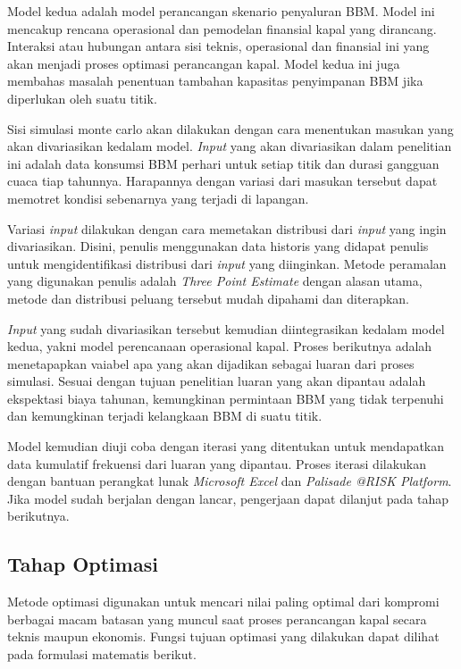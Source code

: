     Model kedua adalah model perancangan skenario penyaluran BBM. Model ini mencakup rencana operasional dan pemodelan finansial kapal yang dirancang. Interaksi atau hubungan antara sisi teknis, operasional dan finansial ini yang akan menjadi proses optimasi perancangan kapal. Model kedua ini juga membahas masalah penentuan tambahan kapasitas penyimpanan BBM jika diperlukan oleh suatu titik.

    Sisi simulasi monte carlo akan dilakukan dengan cara menentukan masukan yang akan divariasikan kedalam model. \emph{Input} yang akan divariasikan dalam penelitian ini adalah data konsumsi BBM perhari untuk setiap titik dan durasi gangguan cuaca tiap tahunnya. Harapannya dengan variasi dari masukan tersebut dapat memotret kondisi sebenarnya yang terjadi di lapangan.

    Variasi \emph{input} dilakukan dengan cara memetakan distribusi dari \emph{input} yang ingin divariasikan. Disini, penulis menggunakan data historis yang didapat penulis untuk mengidentifikasi distribusi dari \emph{input} yang diinginkan. Metode peramalan yang digunakan penulis adalah \emph{Three Point Estimate} dengan alasan utama, metode dan distribusi peluang tersebut mudah dipahami dan diterapkan.

    \emph{Input} yang sudah divariasikan tersebut kemudian diintegrasikan kedalam model kedua, yakni model perencanaan operasional kapal. Proses berikutnya adalah menetapapkan vaiabel apa yang akan dijadikan sebagai luaran dari proses simulasi. Sesuai dengan tujuan penelitian luaran yang akan dipantau adalah ekspektasi biaya tahunan, kemungkinan permintaan BBM yang tidak terpenuhi dan kemungkinan terjadi kelangkaan BBM di suatu titik.

    Model kemudian diuji coba dengan iterasi yang ditentukan untuk mendapatkan data kumulatif frekuensi dari luaran yang dipantau. Proses iterasi dilakukan dengan bantuan perangkat lunak \emph{Microsoft Excel} dan \emph{Palisade @RISK Platform}. Jika model sudah berjalan dengan lancar, pengerjaan dapat dilanjut pada tahap berikutnya.

\subsection{Tahap Optimasi}
\label{subsec:tahap-optimasi}

    Metode optimasi digunakan untuk mencari nilai paling optimal dari kompromi berbagai macam batasan yang muncul saat proses perancangan kapal secara teknis maupun ekonomis. Fungsi tujuan optimasi yang dilakukan dapat dilihat pada formulasi matematis berikut.

